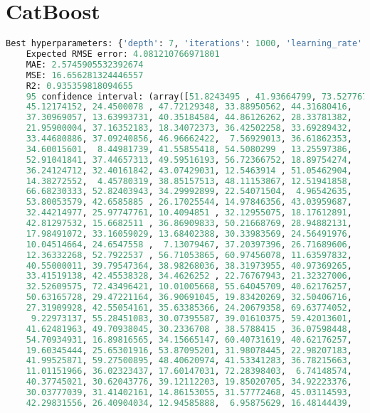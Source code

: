 \documentclass{article}
\begin{document}
\section{CatBoost}

\begin{lstlisting}[language=Python,basicstyle=\ttfamily]
    Best hyperparameters: {'depth': 7, 'iterations': 1000, 'learning_rate': 0.05}
    Expected RMSE error: 4.081210766971801
    MAE: 2.5745905532392674
    MSE: 16.656281324446557
    R2: 0.935359818094655
    95 confidence interval: (array([51.8243495 , 41.93664799, 73.52776705, 33.41519138, 10.11820765,
    45.12174152, 24.4500078 , 47.72129348, 33.88950562, 44.31680416,
    37.30969057, 13.63993731, 40.35184584, 44.86126262, 28.33781382,
    21.95900004, 37.16352183, 18.34072373, 36.42502258, 33.69289432,
    33.44680886, 37.09240856, 46.96662422,  7.56929013, 36.61862353,
    34.60015601,  8.44981739, 41.55855418, 54.5080299 , 13.25597386,
    52.91041841, 37.44657313, 49.59516193, 56.72366752, 18.89754274,
    36.24124712, 32.40161842, 43.07429031, 12.5463914 , 51.05462904,
    14.38272552,  4.45780319, 38.85157513, 48.11153867, 12.51941858,
    66.68230333, 52.82403943, 34.29992899, 22.54071504,  4.96542635,
    53.80053579, 42.6585885 , 26.17025544, 14.97846356, 43.03959687,
    32.44214977, 25.97747761, 10.4094851 , 32.12955075, 18.17612891,
    42.81297532, 15.6682511 , 36.86909833, 50.21668769, 28.94882131,
    17.98491072, 33.16059029, 13.68402388, 30.33983569, 24.56491976,
    10.04514664, 24.6547558 ,  7.13079467, 37.20397396, 26.71689606,
    12.36332268, 52.7922537 , 56.71053865, 60.97456078, 11.63597832,
    40.55000011, 39.79547364, 38.98268036, 38.31973955, 40.97369265,
    33.41519138, 42.45538328, 34.4626252 , 22.76767943, 21.32327006,
    32.52609575, 72.43496421, 10.01005668, 55.64045709, 40.62176257,
    50.63165728, 29.47221164, 36.90691045, 19.83420269, 32.50406716,
    27.31909928, 42.55054161, 35.63385366, 24.20679358, 69.63774052,
     9.22973137, 55.28451083, 30.07395587, 39.01610375, 59.42013601,
    41.62481963, 49.70938045, 30.2336708 , 38.5788415 , 36.07598448,
    54.70934931, 16.89816565, 34.15665147, 60.40731619, 40.62176257,
    19.60345444, 25.65301916, 53.87095201, 31.98078445, 22.98207183,
    41.99525871, 59.27500895, 48.40620974, 41.53341283, 36.78215663,
    11.01151966, 36.02323437, 17.60147031, 72.28398403,  6.74148574,
    40.37745021, 30.62043776, 39.12112203, 19.85020705, 34.92223376,
    30.03777039, 31.41402161, 14.86153055, 31.57772468, 45.03114593,
    42.29831556, 26.40904034, 12.94585888,  6.95875629, 16.48144439,

\end{lstlisting}
\end{document}
